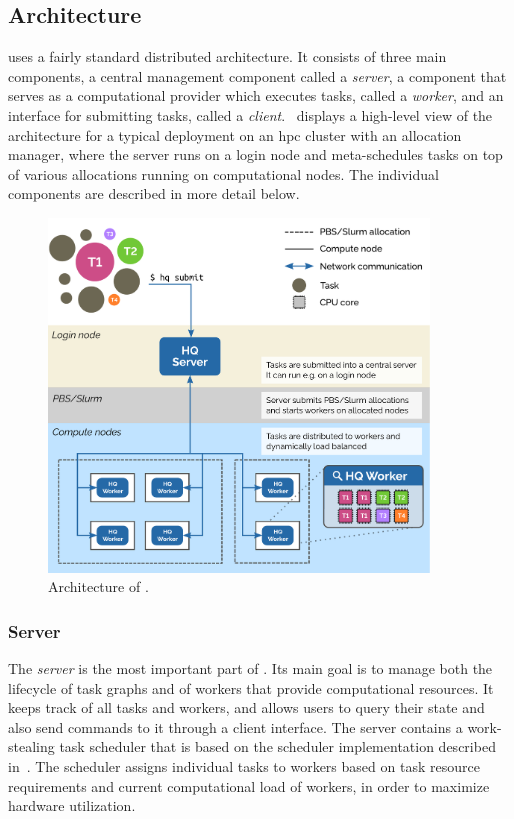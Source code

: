 \subsection{Architecture}
\hyperqueue{} uses a fairly standard distributed architecture. It consists of three main
components, a central management component called a \emph{server}, a component that
serves as a computational provider which executes tasks, called a \emph{worker}, and an
interface for submitting tasks, called a \emph{client}.~ displays
a high-level view of the \hq{} architecture for a typical deployment on an
\gls{hpc} cluster with an allocation manager, where the server runs on a login node
and meta-schedules tasks on top of various allocations running on computational nodes. The
individual components are described in more detail below.

\begin{figure}[h]
	\centering
	\includegraphics[width=0.9\textwidth]{imgs/hq/architecture}
	\caption{Architecture of \hyperqueue{}.}
	\label{fig:hq-architecture}
\end{figure}

\subsubsection*{Server}
The \emph{server} is the most important part of \hyperqueue{}. Its main goal is
to manage both the lifecycle of task graphs and of workers that provide computational resources. It
keeps track of all tasks and workers, and allows users to query their state and also send commands
to it through a client interface. The server contains a work-stealing task scheduler that is based
on the \rsds{} scheduler implementation described in~. The
scheduler assigns individual tasks to workers based on task resource requirements and current
computational load of workers, in order to maximize hardware utilization.

